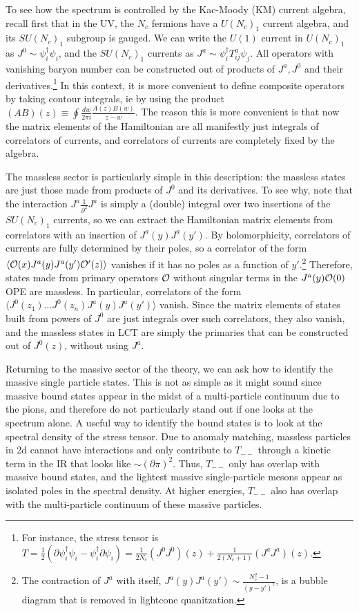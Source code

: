 \documentclass[12pt]{article}
\def\>{\rangle}
\def\<{\langle}
\newcommand{\CO}{{\cal O}}
\newcommand{\ptl}{\partial}
\begin{document}
To see how the spectrum is controlled by the Kac-Moody (KM) current algebra, recall first that in the UV, the $N_c$ fermions have a $U(N_c)_1$ current algebra, and its $SU(N_c)_1$ subgroup is gauged.  We can write the $U(1)$ current in $U(N_c)_1$ as $J^0 \sim \psi_i^\dagger \psi_i$, and the $SU(N_c)_1$ currents as $J^a \sim \psi_i^\dagger T^a_{ij} \psi_j$.  All operators with vanishing baryon number can be constructed out of products of $J^a, J^0$ and their derivatives.\footnote{For instance, the stress tensor is $T= \frac{1}{2} (\partial \psi^\dagger_i \psi_i - \psi_i^\dagger \partial \psi_i) = \frac{1}{2N_c} (J^0 J^0)(z) + \frac{1}{2(N_c+1)} (J^a J^a)(z)$.} In this context, it is more convenient to define composite operators by taking contour integrals,  ie by using the product $(AB)(z) \equiv \oint \frac{dw}{2\pi i } \frac{A(z)B(w)}{z-w}$. The reason this is more convenient is that now the matrix elements of the Hamiltonian are all manifestly just integrals of correlators of currents, and correlators of currents are completely fixed by the algebra. 

 The massless sector is particularly simple in this description: the massless states are just those made from products of $J^0$ and its derivatives.   To see why, note that the interaction $J^a \frac{1}{\partial^2} J^a$ is simply a (double) integral over two insertions of the $SU(N_c)_1$ currents, so we can extract the Hamiltonian matrix elements from correlators with an insertion of $J^a(y) J^a(y')$.  By holomorphicity, correlators of currents are fully determined by their poles, so a correlator of the form $\< \CO(x) J^a(y) J^a(y') \CO'(z)\>$ vanishes if it has  no poles as a function of $y'$.\footnote{The contraction of $J^a$ with itself, $J^a(y) J^a(y') \sim \frac{N_c^2-1}{(y-y')^2}$, is a bubble diagram that is removed in lightcone quanitzation.} Therefore, states made from primary operators $\CO$ without singular terms in the $J^a(y) \CO(0)$ OPE are massless.   In particular,  correlators of the form $\< J^0(z_1) \dots J^0(z_n) J^a(y) J^a(y')\>$ vanish.  Since the matrix elements of states built from powers of $J^0$ are just integrals over such correlators, they also vanish, and the massless states in LCT are simply the primaries that can be constructed out of $J^0(z)$, without using $J^a$.  



Returning to the massive sector of the theory, we can ask how to identify the massive single particle states.  This is not as simple as it might sound since massive bound states appear in the midst of  a multi-particle continuum due to the pions, and therefore do not particularly stand out if one looks at the spectrum alone.   A useful way to identify the bound states is to look at the spectral density of the stress tensor.  Due to anomaly matching, massless particles in 2d cannot have interactions and only contribute to $T_{--}$ through a kinetic term in the IR that looks like $\sim (\ptl \pi)^2$. Thus, $T_{--}$ only has overlap with  massive bound states, and the lightest massive single-particle mesons appear as isolated poles in the spectral density. At higher energies, $T_{--}$ also has overlap with the multi-particle continuum of these massive particles. 
\end{document}
